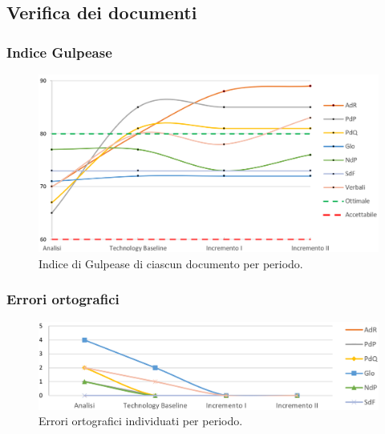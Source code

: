 \subsection{Verifica dei documenti}
\subsubsection{Indice Gulpease}

\begin{figure}[h]
	\centering
	\includegraphics[scale=0.55]{Images/gulpease nuovo}
	\caption{Indice di Gulpease di ciascun documento per periodo.}
\end{figure}
\subsubsection{Errori ortografici}

\begin{figure}[h]
	\centering
	\includegraphics[scale=0.4]{Images/errori}
	\caption{Errori ortograﬁci individuati per periodo.}
\end{figure}